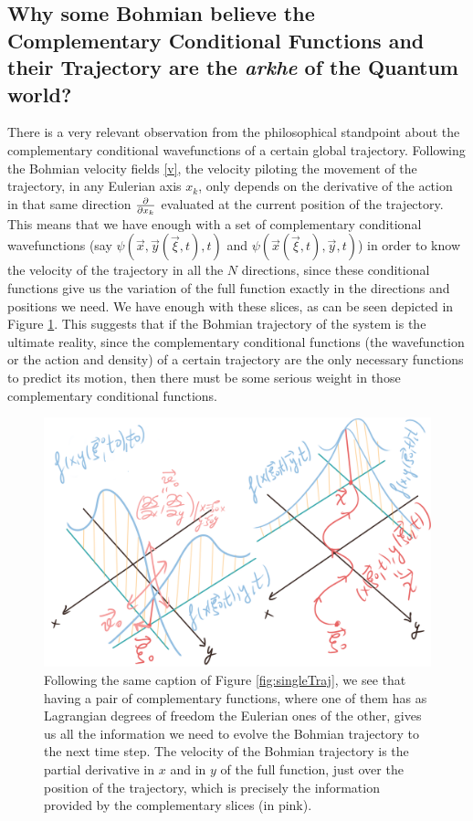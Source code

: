\documentclass[11pt, a4paper]{article} %
\begin{document}
\subsection*{Why some Bohmian believe the Complementary Conditional Functions and their Trajectory are the {\em arkhe} of the Quantum world?}
There is a very relevant observation from the philosophical standpoint about the complementary conditional wavefunctions of a certain global trajectory. Following the Bohmian velocity fields \eqref{v}, the velocity piloting the movement of the trajectory, in any Eulerian axis $x_k$, only depends on the derivative of the action in that same direction $\pdv{}{x_k}$ evaluated at the current position of the trajectory. This means that we have enough with a set of complementary conditional wavefunctions (say $\psi(\vec{x},\vec{y}(\vec{\xi},t),t)$ and $\psi(\vec{x}(\vec{\xi},t),\vec{y},t)$) in order to know the velocity of the trajectory in all the $N$ directions, since these conditional functions give us the variation of the full function exactly in the directions and positions we need. We have enough with these slices, as can be seen depicted in Figure \ref{fig:pair_bohm}. This suggests that if the Bohmian trajectory of the system is the ultimate reality, since the complementary conditional functions (the wavefunction or the action and density) of a certain trajectory are the only necessary functions to predict its motion, then there must be some serious weight in those complementary conditional functions. 

\begin{figure}[h!]
  \centering
    \includegraphics[width=0.65\linewidth]{bohmian_pair.png}
  \caption{Following the same caption of Figure \ref{fig:singleTraj}, we see that having a pair of complementary functions, where one of them has as Lagrangian degrees of freedom the Eulerian ones of the other, gives us all the information we need to evolve the Bohmian trajectory to the next time step. The velocity of the Bohmian trajectory is the partial derivative in $x$ and in $y$ of the full function, just over the position of the trajectory, which is precisely the information provided by the complementary slices (in pink). }
  \label{fig:pair_bohm}
\end{figure}
\end{document}
